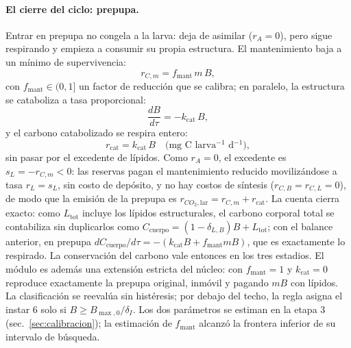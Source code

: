 \paragraph{El cierre del ciclo: prepupa.}
Entrar en prepupa no congela a la larva: deja de asimilar ($r_A = 0$), pero sigue respirando y empieza a consumir su propia estructura. El mantenimiento baja a un mínimo de supervivencia:
\begin{equation}
  r_{C,m} = f_{\mathrm{mant}}\,m\,B,
  \label{eq:prep-mant}
\end{equation}
con $f_{\mathrm{mant}} \in (0,1]$ un factor de reducción que se calibra; en paralelo, la estructura se cataboliza a tasa proporcional:
\begin{equation}
  \frac{dB}{d\tau} = -k_{\mathrm{cat}}\,B,
  \label{eq:prep-cat}
\end{equation}
y el carbono catabolizado se respira entero:
\begin{equation}
  r_{\mathrm{cat}} = k_{\mathrm{cat}}\,B
  \quad \text{(mg~C larva$^{-1}$ d$^{-1}$)},
  \label{eq:rcat}
\end{equation}
sin pasar por el excedente de lípidos. Como $r_A = 0$, el excedente es $s_L = -r_{C,m} < 0$: las reservas pagan el mantenimiento reducido movilizándose a tasa $r_L = s_L$, sin costo de depósito, y no hay costos de síntesis ($r_{C,B} = r_{C,L} = 0$), de modo que la emisión de la prepupa es $r_{CO_2,\mathrm{lar}} = r_{C,m} + r_{\mathrm{cat}}$. La cuenta cierra exacto: como $L_{\mathrm{tot}}$ incluye los lípidos estructurales, el carbono corporal total se contabiliza sin duplicarlos como $C_{\mathrm{cuerpo}} = (1-\delta_{L,B})B + L_{\mathrm{tot}}$; con el balance anterior, en prepupa $dC_{\mathrm{cuerpo}}/d\tau = -(k_{\mathrm{cat}}B + f_{\mathrm{mant}}mB)$, que es exactamente lo respirado. La conservación del carbono vale entonces en los tres estadios. El módulo es además una extensión estricta del núcleo: con $f_{\mathrm{mant}} = 1$ y $k_{\mathrm{cat}} = 0$ reproduce exactamente la prepupa original, inmóvil y pagando $mB$ con lípidos. La clasificación se reevalúa sin histéresis; por debajo del techo, la regla asigna el instar 6 solo si $B \geq B_{\max,0}/\delta_I$. Los dos parámetros se estiman en la etapa 3 (sec.~\ref{sec:calibracion}); la estimación de $f_{\mathrm{mant}}$ alcanzó la frontera inferior de su intervalo de búsqueda.

